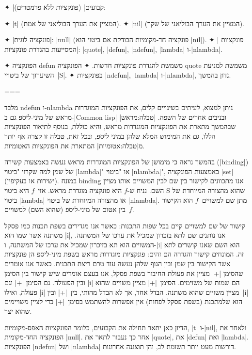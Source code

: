 ✦ \ע|קבועים| (פונקציות ללא פרמטרים):
\begin{itemize}
  ✦ \E|t| (המציין את הערך הבוליאני של אמת).
  ✦ \E|nil| (המציין את הערך הבוליאני של שקר).
\end{itemize}
✦ \ע|פונקציה לוגית|: \E|null| (פונקציה חד-מקומיות הבודקת אם ביטוי הוא \E|nil|).
✦ \ע| פונקציות המסייעות בהגדרת פונקציות|:
\E|quote|, \E|defun|, \E|ndefun|, \E|lambda| ו-\E|nlambda|.
\begin{itemize}
  ✦ הפונקציה defun משמשת להגדרת פונקציות חדשות.
  ✦ הפונקציה quote משמשת למניעת השיערוך של ביטויי~\E|S|.
  ✦ בפונקציות \E|ndefun|, \E|lambda| ו-\E|nlambda|, נדון בהמשך.
\end{itemize}
===

מלבד ndefun ו-nlambda ניתן למצוא, לעיתים בשינויים קלים, את הפונקציות המוגדרות
מראש של מיני-ליספ גם ב-\E|Common lisp| ובניבים אחרים של השפה.
|טבלה:מראש| שבהמשך מתארת את הפונקציות המוגדרות מראש, והיא כוללת, בנוסף
לתיאור הפונקציות הללו, גם את המימוש המלא שלהן במיני-ליספ, ובכל זאת, טבלה זו
קצרה אף יותר מ|טבלה:אטומיות| המתארת את הפונקציות האטומיות.

בהמשך נראה כי מימושן של הפונקציות המוגדרות מראש נעשה באמצעות קשירה
(\E|binding|) של שמן למה שקרוי "ביטוי \E|lambda|" או "ביטוי \E|nlambda|",
באמצעות הפונקציה \E|set| (ישירות או בעקיפין). במונח binding אנו מתכוונים לקישור
בין שם לבין המשויים אותו מציין השם. נניח ש-$f$ היא פונקציה מוגדרת מראש. אזי~$f$
היא ביטוי S שהוא מהצורה המיוחדת של ביטוי \E|lambda| או מהצורה המיוחדת של
ביטוי \E|nlambda|. מתן שם למשויים~$f$ הוא הקישור בין אטום של מיני-ליספ (שהוא
השם) למשויים~$f$.

קישור של שם למשויים קיים בכל שפות התכנות: כאשר אנו מגדירים בשפת תכנות כמו פסקל
משתנה אשר שמו הוא \T|i|, אנו נותנים שם לתא בזכרון שמכיל את ערכו של המשתנה.
המשויים הוא תא בזיכרון שמכיל את ערכו של המשתנה, ו-\T|i| הוא השם שאנו קושרים לתא
זה. המונחים קישור והגדרה הם זהים: פונקציות מוגדרות מראש בשפת מיני-ליספ הן
פונקציות אשר הקישור בין שמן ובין הגוף שלהן נעשה עוד טרם ריצת התכנית. כאשר אנו
אומרים שהסימן \T|+| מציין את פעולת החיבור בשפת פסקל, אנו בעצם אומרים שיש קישור
בין הסימן ובין הפעולה. גם הסימן \T|+| וגם \T|i| הם שמות של משוימים. הסימן~\T|+|
מציין משויים שהוא פעולה, ואילו \T|i| מציין משויים שהוא משתנה. הבדל אחד, אך לא
הבדל מהותי, בין~\T|+| ובין~\T|i| הוא שלמתכנת (בשפת פסקל לפחות) אין אפשרות
להשתמש בסימן~\T|+| כדי לציין משויימים שהוא יצר.

הדיון כאן יתאר תחילה את הקבועים, כלומר הפונקציות האפס-מקומיות, \E|t| ו-\E|nil|,
ולאחר את הפונקציה החד-מקומית \E|null|. אחר כך נעבור לתאר את \E|quote|, את
\E|defun| ואת \E|lambda|. הפונקציות \E|ndefun| ושל \E|nlambda| דורשות מעט יותר
תשומת לב, והן תוצגנה אחרונות.

